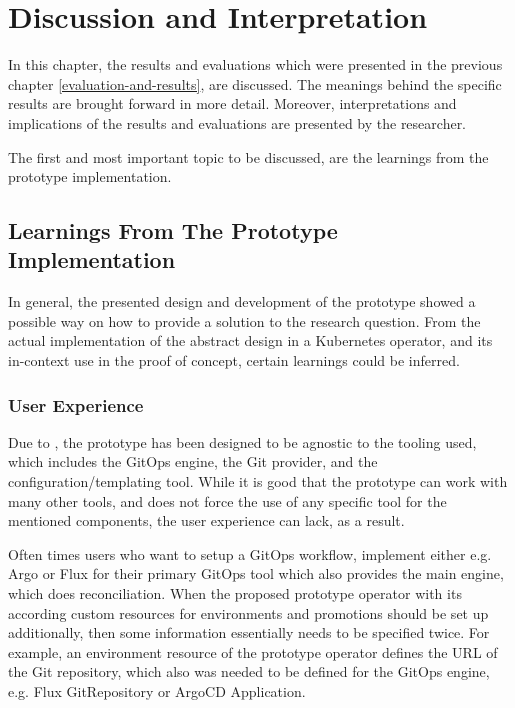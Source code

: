 \chapter{Discussion and Interpretation}
\label{discussion-and-interpretation}

In this chapter,
the results and evaluations which were presented in the previous chapter \ref{evaluation-and-results},
are discussed. The meanings behind the specific results are brought forward in more detail.
Moreover, interpretations and implications of the results and evaluations are presented by the researcher.

The first and most important topic to be discussed,
are the learnings from the prototype implementation.

\section{Learnings From The Prototype Implementation}

In general, the presented design and development of the prototype
showed a possible way on how to provide a solution to the research question.
From the actual implementation of the abstract design in a Kubernetes operator,
and its in-context use in the proof of concept,
certain learnings could be inferred.

\subsection*{User Experience}

Due to ,
the prototype has been designed to be agnostic to the tooling used, which includes the GitOps engine, the Git provider, and the configuration/templating tool.
While it is good that the prototype can work with many other tools,
and does not force the use of any specific tool for the mentioned components,
the user experience can lack, as a result.

Often times users who want to setup a GitOps workflow,
implement either e.g. Argo or Flux for their primary GitOps tool which also provides the main engine,
which does reconciliation.
When the proposed prototype operator with its according custom resources for environments and promotions
should be set up additionally,
then some information essentially needs to be specified twice. For example,
an environment resource of the prototype operator defines the URL of the Git repository,
which also was needed to be defined for the GitOps engine, e.g. Flux GitRepository or ArgoCD Application.

